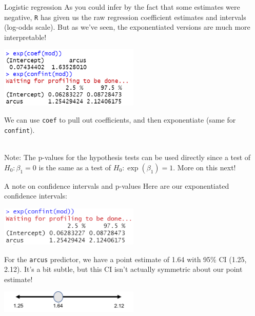 \documentclass[10pt,t]{beamer}
\begin{document}
\begin{frame}{Logistic regression}
	As you could infer by the fact that some estimates were negative, \texttt{R} has given us the raw regression coefficient estimates and intervals (log-odds scale). But as we've seen, the exponentiated versions are much more interpretable!
	\begin{center}
	\includegraphics[width=0.5\textwidth]{./figs/simple_logistic_regression_arcus_exponentiated}
\end{center}
	We can use \texttt{coef} to pull out coefficients, and then exponentiate (same for \texttt{confint}). 
	\\ ~\ 
	
	Note: The p-values for the hypothesis tests can be used directly since a test of $H_0: \beta_1 = 0$ is the same as a test of $H_0: \exp(\beta_1) = 1$. More on this next!
\end{frame}

\begin{frame}{A note on confidence intervals and p-values}
	\vspace{-0.7cm}
	Here are our exponentiated confidence intervals:
	
	\begin{center}
		\includegraphics[width=0.5\textwidth]{./figs/asymmetric_CI}
	\end{center}
	For the \texttt{arcus} predictor, we have a point estimate of 1.64 with 95\% CI (1.25, 2.12). It's a bit subtle, but this CI isn't actually symmetric about our point estimate!
	\begin{center}
		\includegraphics[width=0.5\textwidth]{./figs/asymmetric_CI_pic}
	\end{center}
\end{frame}
\end{document}

